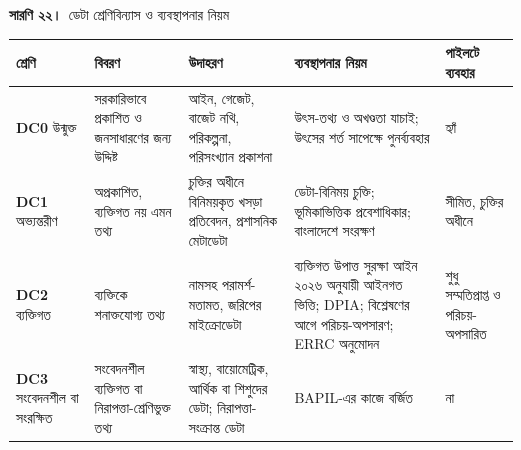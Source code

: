\documentclass[border=10pt]{standalone}
\begin{document}
\begin{minipage}{17cm}
{\large\bfseries সারণি ২২।}\ {\large ডেটা শ্রেণিবিন্যাস ও ব্যবস্থাপনার নিয়ম}\par\vspace{7pt}
\small
{}
\begin{tabularx}{\linewidth}{@{}>{\hsize=0.693\hsize\raggedright\arraybackslash}X>{\hsize=0.990\hsize\raggedright\arraybackslash}X>{\hsize=1.188\hsize\raggedright\arraybackslash}X>{\hsize=1.386\hsize\raggedright\arraybackslash}X>{\hsize=0.743\hsize\raggedright\arraybackslash}X@{}}
\arrayrulecolor{bapilrule}\toprule
\rowcolor{white}\textbf{শ্রেণি} & \textbf{বিবরণ} & \textbf{উদাহরণ} & \textbf{ব্যবস্থাপনার নিয়ম} & \textbf{পাইলটে ব্যবহার} \\
\midrule
\textbf{DC0} উন্মুক্ত & সরকারিভাবে প্রকাশিত ও জনসাধারণের জন্য উদ্দিষ্ট & আইন, গেজেট, বাজেট নথি, পরিকল্পনা, পরিসংখ্যান প্রকাশনা & উৎস-তথ্য ও অখণ্ডতা যাচাই; উৎসের শর্ত সাপেক্ষে পুনর্ব্যবহার & হ্যাঁ \\
\textbf{DC1} অভ্যন্তরীণ & অপ্রকাশিত, ব্যক্তিগত নয় এমন তথ্য & চুক্তির অধীনে বিনিময়কৃত খসড়া প্রতিবেদন, প্রশাসনিক মেটাডেটা & ডেটা-বিনিময় চুক্তি; ভূমিকাভিত্তিক প্রবেশাধিকার; বাংলাদেশে সংরক্ষণ & সীমিত, চুক্তির অধীনে \\
\textbf{DC2} ব্যক্তিগত & ব্যক্তিকে শনাক্তযোগ্য তথ্য & নামসহ পরামর্শ-মতামত, জরিপের মাইক্রোডেটা & ব্যক্তিগত উপাত্ত সুরক্ষা আইন ২০২৬ অনুযায়ী আইনগত ভিত্তি; DPIA; বিশ্লেষণের আগে পরিচয়-অপসারণ; ERRC অনুমোদন & শুধু সম্মতিপ্রাপ্ত ও পরিচয়-অপসারিত \\
\textbf{DC3} সংবেদনশীল বা সংরক্ষিত & সংবেদনশীল ব্যক্তিগত বা নিরাপত্তা-শ্রেণিভুক্ত তথ্য & স্বাস্থ্য, বায়োমেট্রিক, আর্থিক বা শিশুদের ডেটা; নিরাপত্তা-সংক্রান্ত ডেটা & BAPIL-এর কাজে বর্জিত & না \\
\bottomrule
\end{tabularx}
\par{}
\end{minipage}
\end{document}
